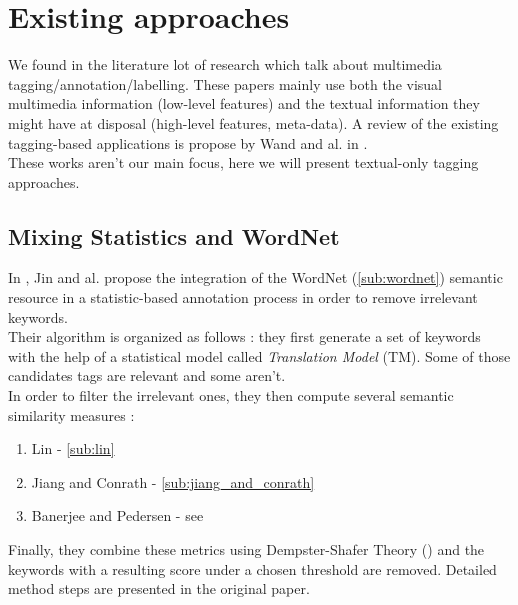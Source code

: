 
\chapter{Existing approaches} %

\label{chapter:ExistingServices} %


We found in the literature lot of research which talk about multimedia tagging/annotation/labelling. These papers mainly use both the visual multimedia information (low-level features) and the textual information they might have at disposal (high-level features, meta-data). A review of the existing tagging-based applications is propose by Wand and al. in \cite{wang2012assistive}.\\
These works aren't our main focus, here we will present textual-only tagging approaches.

\section{Mixing Statistics and WordNet} %
\label{sec:mixing_statistics_and_wordnet}
In \cite{jin2005image}, Jin and al. propose the integration of the WordNet (\ref{sub:wordnet}) semantic resource in a statistic-based annotation process in order to remove irrelevant keywords.\\

Their algorithm is organized as follows : they first generate a set of keywords with the help of a statistical model called \emph{Translation Model} (TM). Some of those candidates tags are relevant and some aren't.\\
In order to filter the irrelevant ones, they then compute several semantic similarity measures : 
\begin{enumerate}
	\item Lin - \ref{sub:lin}
	\item Jiang and Conrath - \ref{sub:jiang_and_conrath}
	\item Banerjee and Pedersen - see \cite{banerjee2003extended}
\end{enumerate}
Finally, they combine these metrics using Dempster-Shafer Theory (\cite{shafer1976mathematical}) and the keywords with a resulting score under a chosen threshold are removed. Detailed method steps are presented in the original paper. \\


